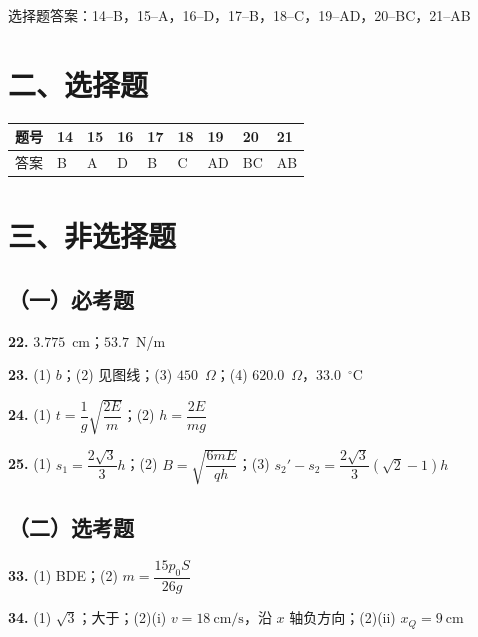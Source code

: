 
\begin{gknotice}
  选择题答案：14--B，15--A，16--D，17--B，18--C，19--AD，20--BC，21--AB
\end{gknotice}

\section*{二、选择题}

\noindent
\begin{tabular}{@{}lllllllll@{}}
\toprule
题号 & 14 & 15 & 16 & 17 & 18 & 19 & 20 & 21\\
\midrule
答案 & B & A & D & B & C & AD & BC & AB\\
\bottomrule
\end{tabular}

\section*{三、非选择题}

\subsection*{（一）必考题}

\noindent
\textbf{22.} $3.775$~cm；$53.7$~N/m

\smallskip

\noindent
\textbf{23.} (1) $b$；\quad(2) 见图线；\quad(3) $450$~$\Omega$；\quad(4) $620.0$~$\Omega$，$33.0$~$^{\circ}$C

\smallskip

\noindent
\textbf{24.} (1) $t=\dfrac{1}{g}\sqrt{\dfrac{2E}{m}}$；\quad(2) $h=\dfrac{2E}{mg}$

\smallskip

\noindent
\textbf{25.} (1) $s_{1}=\dfrac{2\sqrt{3}}{3}h$；\quad(2) $B=\sqrt{\dfrac{6mE}{qh}}$；\quad(3) $s_{2}'-s_{2}=\dfrac{2\sqrt{3}}{3}\left(\sqrt{2}-1\right)h$

\subsection*{（二）选考题}

\noindent
\textbf{33.} (1) BDE；\quad(2) $m=\dfrac{15p_{0}S}{26g}$

\smallskip

\noindent
\textbf{34.} (1) $\sqrt{3}$；大于；\quad(2)(i) $v=\SI{18}{\centi\metre\per\second}$，沿 $x$ 轴负方向；\quad(2)(ii) $x_{Q}=\SI{9}{\centi\metre}$

